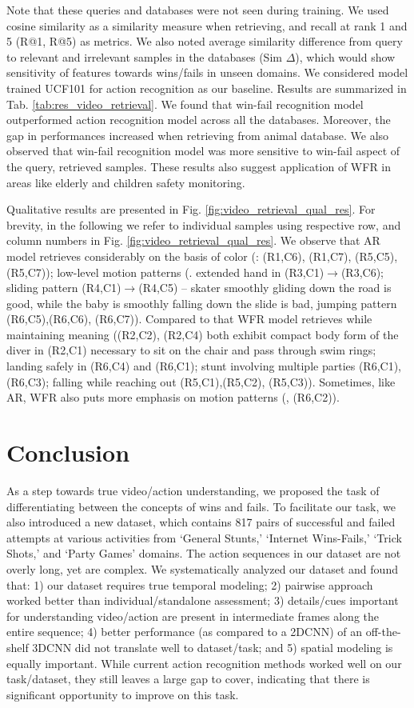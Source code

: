 \documentclass[final]{cvpr}
\begin{document}
Note that these queries and databases were not seen during training. We used cosine similarity as a similarity measure when retrieving, and recall at rank 1 and 5 (R@1, R@5) as metrics. We also noted average similarity difference from query to relevant and irrelevant samples in the databases (Sim $\Delta$), which would show sensitivity of features towards wins/fails in unseen domains. We considered model trained UCF101 for action recognition as our baseline. Results are summarized in Tab. \ref{tab:res_video_retrieval}. We found that win-fail recognition model outperformed action recognition model across all the databases. Moreover, the gap in performances increased when retrieving from animal database. We also observed that win-fail recognition model was more sensitive to win-fail aspect of the query, retrieved samples. These results also suggest application of WFR in areas like elderly and children safety monitoring. 

Qualitative results are presented in Fig. \ref{fig:video_retrieval_qual_res}. For brevity, in the following we refer to individual samples using respective row, and column numbers in Fig. \ref{fig:video_retrieval_qual_res}. We observe that AR model retrieves considerably on the basis of color (\eg: (R1,C6), (R1,C7), (R5,C5), (R5,C7)); low-level motion patterns (\eg. extended hand in (R3,C1)$\rightarrow$(R3,C6); sliding pattern (R4,C1)$\rightarrow$(R4,C5) -- skater smoothly gliding down the road is good, while the baby is smoothly falling down the slide is bad, jumping pattern (R6,C5),(R6,C6), (R6,C7)). Compared to that WFR model retrieves while maintaining meaning (\eg (R2,C2), (R2,C4) both exhibit compact body form of the diver in (R2,C1) necessary to sit on the chair and pass through swim rings; landing safely in (R6,C4) and (R6,C1); stunt involving multiple parties (R6,C1), (R6,C3); falling while reaching out (R5,C1),(R5,C2), (R5,C3)). Sometimes, like AR, WFR also puts more emphasis on motion patterns (\eg, (R6,C2)). \section{Conclusion}
As a step towards true video/action understanding, we proposed the task of differentiating between the concepts of wins and fails. To facilitate our task, we also introduced a new dataset, which contains 817 pairs of successful and failed attempts at various activities from `General Stunts,' `Internet Wins-Fails,' `Trick Shots,' and `Party Games' domains. The action sequences in our dataset are not overly long, yet are complex. We systematically analyzed our dataset and found that: 1) our dataset requires true temporal modeling; 2) pairwise approach worked better than individual/standalone assessment; 3) details/cues important for understanding video/action are present in intermediate frames along the entire sequence; 4) better performance (as compared to a 2DCNN) of an off-the-shelf 3DCNN did not translate well to dataset/task; and 5) spatial modeling is equally important. While current action recognition methods worked well on our task/dataset, they still leaves a large gap to cover, indicating that there is significant opportunity to improve on this task. 

{\small


}
\end{document}
